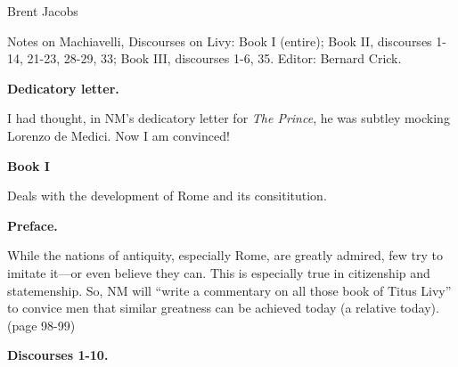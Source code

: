 \documentclass[11pt]{article}
\newcommand{\book}[1]{{\Large {\bfseries Book #1}}}
\newcommand{\discourses}[1]{{\bfseries Discourses #1.}}
\newcommand{\p}{page }
\begin{document}
\hfill Brent Jacobs

Notes on Machiavelli, Discourses on Livy: 
Book I (entire);
Book II, discourses 1-14, 21-23, 28-29,
33; 
Book III, discourses 1-6, 35.
Editor: Bernard Crick.

{\Large{\bfseries Dedicatory letter.}}

I had thought, in NM's dedicatory letter for \textsl{The Prince}, he was
subtley mocking Lorenzo de Medici. Now I am convinced!

\book{I}

Deals with the development of Rome and its consititution.

{\bfseries Preface.}

While the nations of antiquity, especially Rome, are
greatly admired, few try to imitate it---or even believe they can. 
This is especially true in citizenship and statemenship. So, NM will
``write a commentary on all those book of Titus Livy'' to convice men
that similar greatness can be achieved today (a relative today). (\p 98-99) 

\discourses{1-10}
\end{document}

